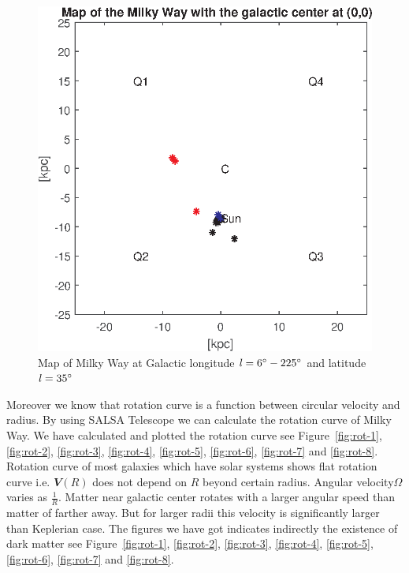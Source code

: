 \documentclass[fleqn,usenatbib]{mnras}
\begin{document}
\begin{figure}
      \includegraphics[width=\columnwidth]{Map_8}
      \caption{Map of Milky Way at Galactic longitude $\mathit{l}=6\hbox{$^\circ$}-225\hbox{$^\circ$}$ and latitude $\mathit{l}=35\hbox{$^\circ$}$}
      \label{fig:map-8}
\end{figure}

Moreover we know that rotation curve is a function between circular velocity and radius. By using SALSA Telescope we can calculate the rotation curve of Milky Way. We have calculated and plotted the rotation curve see Figure~\ref{fig:rot-1}, \ref{fig:rot-2}, \ref{fig:rot-3}, \ref{fig:rot-4}, \ref{fig:rot-5}, \ref{fig:rot-6}, \ref{fig:rot-7} and \ref{fig:rot-8}. Rotation curve of most galaxies which have solar systems shows flat rotation curve i.e. $\mathbfit{V}(\mathit{R})$ does not depend on $\mathit{R}$ beyond certain radius. Angular velocity$\Omega$ varies as $\frac{1}{\mathit{R}}$. Matter near galactic center rotates with a larger angular speed than matter of farther away. But for larger radii this velocity is significantly larger than Keplerian case\citep{DanielDahlin2015}. The figures we have got indicates indirectly the existence of dark matter see Figure~\ref{fig:rot-1}, \ref{fig:rot-2}, \ref{fig:rot-3}, \ref{fig:rot-4}, \ref{fig:rot-5}, \ref{fig:rot-6}, \ref{fig:rot-7} and \ref{fig:rot-8}.
\end{document}
